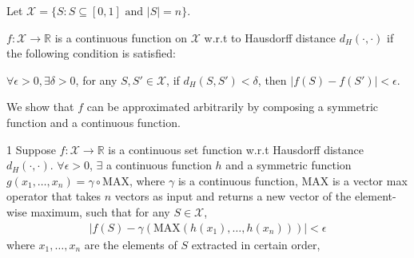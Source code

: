 Let $\mathcal{X}=\{S: S\subseteq [0,1]\mbox{ and } |S|=n \}$. 

$f:\mathcal{X}\rightarrow \mathbb{R}$ is a continuous function on $\mathcal{X}$ w.r.t to Hausdorff distance $d_H(\cdot, \cdot)$ if the following condition is satisfied:

$\forall \epsilon > 0, \exists \delta >0$, for any $S, S'\in\mathcal{X}$, if $d_H(S, S') < \delta$, then $|f(S)-f(S')|< \epsilon$.

We show that $f$ can be approximated arbitrarily by composing a symmetric function and a continuous function. 

\begin{customthm}{1}
Suppose $f:\mathcal{X}\rightarrow \mathbb{R}$ is a continuous set function w.r.t Hausdorff distance $d_H(\cdot, \cdot)$. $\forall \epsilon > 0$, $\exists$ a continuous function $h$ and a symmetric function $g(x_1, \dots, x_n)=\gamma \circ \mbox{MAX}$, where $\gamma$ is a continuous function, $\mbox{MAX}$ is a vector max operator that takes $n$ vectors as input and returns a new vector of the element-wise maximum, such that for any $S\in\mathcal{X}$,
\begin{align*}
	|f(S) - \gamma(\mbox{MAX}(h(x_1), \ldots, h(x_n)))| < \epsilon
\end{align*}
where $x_1, \ldots, x_n$ are the elements of $S$ extracted in certain order, 
\end{customthm}

